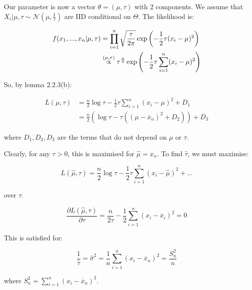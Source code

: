 \documentclass[a4paper]{article}
\begin{document}
            Our parameter is now a vector $\theta = (\mu, \tau)$ with 2
            components. We assume that $X_i | \mu, \tau \sim \mathcal{N}(\mu,
            \frac{1}{\tau})$ are IID conditional on $\Theta$. The likelihood is:

            \begin{align*}
                f(x_1, ..., x_n | \mu, \tau) & = \prod_{i=1}^n
                    \sqrt{\frac{\tau}{2\pi}} \exp\left(-\frac{1}{2} \tau(x_i -
                    \mu)^2\right) \\
                & \stackrel{({\mu, \tau})}{\propto} \tau^{\frac{n}{2}} \exp\left(-\frac{1}{2}
                    \tau \sum_{i=1}^n (x_i - \mu)^2\right) \\
            \end{align*}

            So, by lemma 2.2.3(b):

            \begin{align*}
                L(\mu, \tau) &= \frac{n}{2}\log\tau - \frac{1}{2}\tau \sum_{i=1}
                    ^n (x_i - \mu)^2 + D_1 \\
                & = \frac{n}{2} \left(\log\tau - \tau((\mu - \overline x_n)^2 +
                    D_2)\right) + D_3
            \end{align*}

            where $D_1, D_2, D_3$ are the terms that do not depend on $\mu$ or
            $\tau$.

            Clearly, for any $\tau > 0$, this is maximised for $\widehat \mu =
            \overline x_n$. To find $\widehat \tau$, we must maximise:

            \[
                L(\widehat \mu, \tau) = \frac{n}{2}\log\tau - \frac{1}{2}\tau
                \sum_{i=1}^n (x_i - \widehat \mu)^2 + ...
            \]

            over $\tau$.

            \[
                \frac{\partial L(\widehat \mu, \tau)}{\partial \tau} =
                \frac{n}{2\tau} - \frac{1}{2} \sum_{i=1}^n (x_i - \overline
                x_i)^2 = 0
            \]

            This is satisfied for:

            \[
                \frac{1}{\widehat \tau} = \widehat \sigma^2 = \frac{1}{n}
                \sum_{i=1}^n (x_i - \overline x_n)^2 = \frac{S_n^2}{n}
            \]

            where $S_n^2 = \sum\limits_{i=1}^n (x_i - \overline x_n)^2$.
\end{document}
